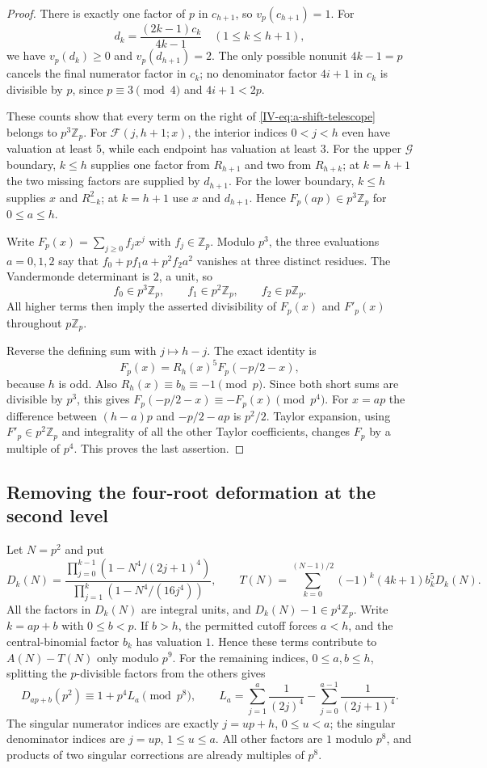 \documentclass[11pt,letterpaper]{article}
\numberwithin{equation}{section}
\begin{document}
\begin{proof}
There is exactly one factor of $p$ in $c_{h+1}$, so
$v_p(c_{h+1})=1$. For
\[
 d_k=\frac{(2k-1)c_k}{4k-1}\quad(1\le k\le h+1),
\]
we have $v_p(d_k)\ge0$ and $v_p(d_{h+1})=2$.
The only possible nonunit $4k-1=p$ cancels the final numerator
factor in $c_k$; no denominator factor $4i+1$ in $c_k$ is divisible
by $p$, since $p\equiv3\pmod4$ and $4i+1<2p$.

These counts show that every term on the right of
\eqref{IV-eq:a-shift-telescope} belongs to $p^3\mathbb Z_p$.
For $\mathcal F(j,h+1;x)$, the interior indices $0<j<h$ even have
valuation at least $5$, while each endpoint has valuation at least
$3$. For the upper $\mathcal G$ boundary, $k\le h$ supplies one
factor from $R_{h+1}$ and two from $R_{h+k}$; at $k=h+1$ the two
missing factors are supplied by $d_{h+1}$. For the lower boundary,
$k\le h$ supplies $x$ and $R_{-k}^2$; at $k=h+1$ use $x$ and
$d_{h+1}$. Hence $F_p(ap)\in p^3\mathbb Z_p$ for $0\le a\le h$.

Write $F_p(x)=\sum_{j\ge0}f_jx^j$ with $f_j\in\mathbb Z_p$.
Modulo $p^3$, the three evaluations $a=0,1,2$ say that
$f_0+pf_1a+p^2f_2a^2$ vanishes at three distinct residues. The
Vandermonde determinant is $2$, a unit, so
\[
 f_0\in p^3\mathbb Z_p,\qquad f_1\in p^2\mathbb Z_p,
 \qquad f_2\in p\mathbb Z_p.
\]
All higher terms then imply the asserted divisibility of $F_p(x)$
and $F'_p(x)$ throughout $p\mathbb Z_p$.

Reverse the defining sum with $j\mapsto h-j$. The exact identity is
\[
 F_p(x)=R_h(x)^5 F_p(-p/2-x),
\]
because $h$ is odd. Also $R_h(x)\equiv b_h\equiv-1\pmod p$.
Since both short sums are divisible by $p^3$, this gives
$F_p(-p/2-x)\equiv-F_p(x)\pmod{p^4}$.
For $x=ap$ the difference between $(h-a)p$ and $-p/2-ap$ is
$p^2/2$. Taylor expansion, using $F'_p\in p^2\mathbb Z_p$ and
integrality of all the other Taylor coefficients, changes $F_p$ by
a multiple of $p^4$. This proves the last assertion.
\end{proof}

\subsection{Removing the four-root deformation at the second level}
Let $N=p^2$ and put
\[
 D_k(N)=
 \frac{\prod_{j=0}^{k-1}(1-N^4/(2j+1)^4)}
      {\prod_{j=1}^{k}(1-N^4/(16j^4))},\qquad
 T(N)=\sum_{k=0}^{(N-1)/2}(-1)^k(4k+1)b_k^5D_k(N).
\]
All the factors in $D_k(N)$ are integral units, and
$D_k(N)-1\in p^4\mathbb Z_p$.
Write $k=ap+b$ with $0\le b<p$. If $b>h$, the permitted cutoff
forces $a<h$, and the central-binomial factor $b_k$ has valuation
$1$. Hence these terms contribute to $A(N)-T(N)$ only modulo $p^9$.
For the remaining indices, $0\le a,b\le h$, splitting the
$p$-divisible factors from the others gives
\[
 D_{ap+b}(p^2)\equiv1+p^4L_a\pmod{p^8},\qquad
 L_a=\sum_{j=1}^{a}\frac1{(2j)^4}
              -\sum_{j=0}^{a-1}\frac1{(2j+1)^4}.
\]
The singular numerator indices are exactly $j=up+h$, $0\le u<a$;
the singular denominator indices are $j=up$, $1\le u\le a$.
All other factors are $1$ modulo $p^8$, and products of two
singular corrections are already multiples of $p^8$.
\end{document}
